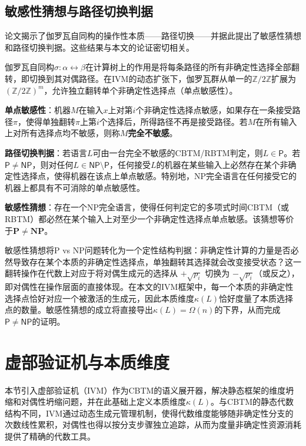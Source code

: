 \documentclass{ctexart}
\begin{document}
	\subsection{敏感性猜想与路径切换判据}
	
	论文\cite{models2026}揭示了伽罗瓦自同构的操作性本质——路径切换——并据此提出了敏感性猜想和路径切换判据。这些结果与本文的论证密切相关。
	
	伽罗瓦自同构$\sigma: \alpha \leftrightarrow \beta$在计算树上的作用是将每条路径的所有非确定性选择全部翻转，即切换到其对偶路径。在IVM的动态扩张下，伽罗瓦群从单一的$\mathbb{Z}/2\mathbb{Z}$扩展为$(\mathbb{Z}/2\mathbb{Z})^m$，允许独立翻转单个非确定性选择点（单点敏感性）。
	
	\textbf{单点敏感性}：机器$M$在输入$x$上对第$i$个非确定性选择点敏感，如果存在一条接受路径$\pi$，使得单独翻转$\pi$上第$i$个选择后，所得路径不再是接受路径。若$M$在所有输入上对所有选择点均不敏感，则称$M$\textbf{完全不敏感}。
	
	\textbf{路径切换判据}：若语言$L$可由一台完全不敏感的CBTM/RBTM判定，则$L \in \mathsf{P}$。若$\mathsf{P} \neq \mathsf{NP}$，则对任何$L \in \mathsf{NP} \setminus \mathsf{P}$，任何接受$L$的机器在某些输入上必然存在某个非确定性选择点，使得机器在该点上单点敏感。特别地，NP完全语言在任何接受它的机器上都具有不可消除的单点敏感性。
	
	\textbf{敏感性猜想}：存在一个NP完全语言，使得任何判定它的多项式时间CBTM（或RBTM）都必然在某个输入上对至少一个非确定性选择点单点敏感。该猜想等价于$\mathbf{P}\neq\mathbf{NP}$。
	
	敏感性猜想将P vs NP问题转化为一个定性结构判据：非确定性计算的力量是否必然导致存在某个本质的非确定性选择点，单独翻转其选择就会改变接受状态？这一翻转操作在代数上对应于将对偶生成元的选择从 $+\sqrt{p_i}$ 切换为 $-\sqrt{p_i}$（或反之），即对偶性在操作层面的直接体现。在本文的IVM框架中，每一个本质的非确定性选择点恰好对应一个被激活的生成元，因此本质维度$\kappa(L)$恰好度量了本质选择点的数量。敏感性猜想的成立将直接导出$\kappa(L) = \Omega(n)$的下界，从而完成$\mathsf{P} \neq \mathsf{NP}$的证明。
	
	
	
	\section{虚部验证机与本质维度}
	
	本节引入虚部验证机（IVM）作为CBTM的语义展开器，解决静态框架的维度坍缩和对偶性坍缩问题，并在此基础上定义本质维度$\kappa(L)$。与CBTM的静态代数结构不同，IVM通过动态生成元管理机制，使得代数维度能够随非确定性分支的次数线性累积，对偶性也得以按分支步骤独立追踪，从而为度量非确定性资源消耗提供了精确的代数工具。
	
\end{document}

